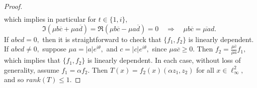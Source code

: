 \documentclass{amsart}
\theoremstyle{definition}
\theoremstyle{remark}
\numberwithin{equation}{section}
\begin{document}
\begin{proof}
\begin{eqnarray*}
\end{eqnarray*}
	which implies in particular  for $t\in \{1,i\},$
	\[\Im(\mu b\overline{c}+\mu a\overline{d})=\Re(\mu b\overline{c}-\mu a\overline{d})=0\quad\Rightarrow \quad \mu b\overline{c}=\overline{\mu a}d.\]
	If $abcd=0,$ then it is straightforward to check that $\{f_1,f_2\}$ is linearly dependent.  If $abcd\neq 0,$ suppose $\mu a=|a|e^{i\theta},$ and $c=|c|e^{i\theta},$ since $\mu a\overline{c}\geq 0.$ Then $f_2=\frac{\mu \overline{c}}{\overline{\mu a}}f_1,$
	which implies that $\{f_1,f_2\}$ is linearly dependent. In each case, without loss of generality, assume $f_1=\alpha f_2.$ Then $T(x)=f_2(x)(\alpha z_1,z_2)$ for all $x\in \ell_\infty^2,$ and so $rank(T)\leq 1.$
\end{proof}
\end{document}
